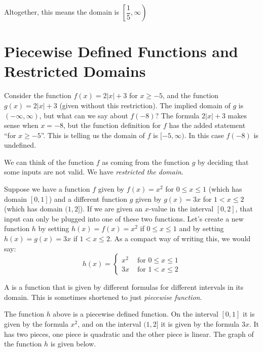 \documentclass[nooutcomes]{ximera}
\begin{document}
\begin{example}
\begin{explanation}
			Altogether, this means the domain is $\left[ \dfrac{1}{5}, \infty \right)$
		\end{explanation}
	\end{example}


\section{Piecewise Defined Functions and Restricted Domains}
	Consider the function $f(x) = 2|x|+3$ for $x \geq -5$, and the function $g(x) = 2|x|+3$ (given without this restriction).  The implied domain of $g$ is $(-\infty, \infty)$, 
	but what can we say about $f(-8)$? The formula $2|x|+3$ makes sense when $x=-8$, but the function 
	definition for $f$ has the added statement ``for $x \geq -5$''. This is telling us the domain of $f$ is $[-5, \infty)$. In this case $f(-8)$ is undefined. 
	
	We can think of the function $f$ as coming from the function $g$ by deciding that some inputs are not valid. We have \emph{restricted the domain}.
	
	Suppose we have a function $f$ given by $f(x)=x^2$ for $0\leq x \leq 1$ (which has domain $[0,1]$) and a different function $g$ given by
	$g(x) = 3x$ for $1 < x \leq 2$ (which has domain $(1, 2]$). If we are given an $x$-value in the interval $[0,2]$, that input can only be
	plugged into one of these two functions. Let's create a new function $h$ by setting $h(x) = f(x) = x^2$ if $0\leq x \leq 1$ and by setting 
	$h(x) = g(x)=3x$ if $1 < x \leq 2$. As a compact way of writing this, we would say:
	$$ h(x) = \begin{cases} x^2 & \text{ for } 0 \leq x \leq 1 \\ 3x & \text{ for } 1 < x \leq 2\end{cases}$$
	
	\begin{definition}
		A  is a function that is given by different formulas for different intervals in its domain. 
		This is sometimes shortened to just \emph{piecewise function}.
	\end{definition}

	The function $h$ above is a piecewise defined function. On the interval $[0,1]$ it is given by the formula $x^2$, and on the interval $(1,2]$
	it is given by the formula $3x$. It has two pieces, one piece is quadratic and the other piece is linear. The graph of the function $h$ is given below.
\end{document}
